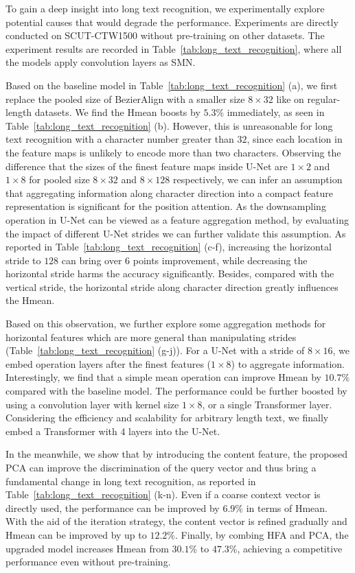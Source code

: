 \documentclass[10pt,journal,compsoc]{IEEEtran}
\begin{document}
To gain a deep insight into long text recognition, we experimentally explore potential causes that would degrade the performance. Experiments are directly conducted on SCUT-CTW1500 without pre-training on other datasets. The experiment results are recorded in Table~\ref{tab:long_text_recognition}, where all the models apply convolution layers as SMN.

Based on the baseline model in Table~\ref{tab:long_text_recognition} (a), we first replace the pooled size of BezierAlign with a smaller size $8 \times 32$ like on regular-length datasets. We find the Hmean boosts by $5.3\%$ immediately, as seen in Table~\ref{tab:long_text_recognition} (b). However, this is unreasonable for long text recognition with a character number greater than $32$, since each location in the feature maps is unlikely to encode more than two characters. Observing the difference that the sizes of the finest feature maps inside U-Net are $1 \times 2$ and $1 \times 8$ for pooled size $8 \times 32$  and $8 \times 128$ respectively, we can infer an assumption that aggregating information along character direction into a compact feature representation is significant for the position attention. As the downsampling operation in U-Net can be viewed as a feature aggregation method, by evaluating the impact of different U-Net strides we can further validate this assumption. As reported in Table~\ref{tab:long_text_recognition} (c-f), increasing the horizontal stride to $128$ can bring over $6$ points improvement, while decreasing the horizontal stride harms the accuracy significantly. Besides, compared with the vertical stride, the horizontal stride along character direction greatly influences the Hmean.

Based on this observation, we further explore some aggregation methods for horizontal features which are more general than manipulating strides (Table~\ref{tab:long_text_recognition} (g-j)). For a U-Net with a stride of $8 \times 16$, we embed operation layers after the finest features ($1 \times 8$) to aggregate information. Interestingly, we find that a simple mean operation can improve Hmean by $10.7\%$ compared with the baseline model. The performance could be further boosted by using a convolution layer with kernel size $1 \times 8$, or a single Transformer layer. Considering the efficiency and scalability for arbitrary length text, we finally embed a Transformer with 4 layers into the U-Net.

In the meanwhile, we show that by introducing the content feature, the proposed PCA can improve the discrimination of the query vector and thus bring a fundamental change in long text recognition, as reported in Table~\ref{tab:long_text_recognition} (k-n). Even if a coarse context vector is directly used, the performance can be improved by $6.9\%$ in terms of Hmean. With the aid of the iteration strategy, the content vector is refined gradually and Hmean can be improved by up to $12.2\%$. Finally, by combing HFA and PCA, the upgraded model increases Hmean from $30.1\%$ to $47.3\%$, achieving a competitive performance even without pre-training.
\end{document}
